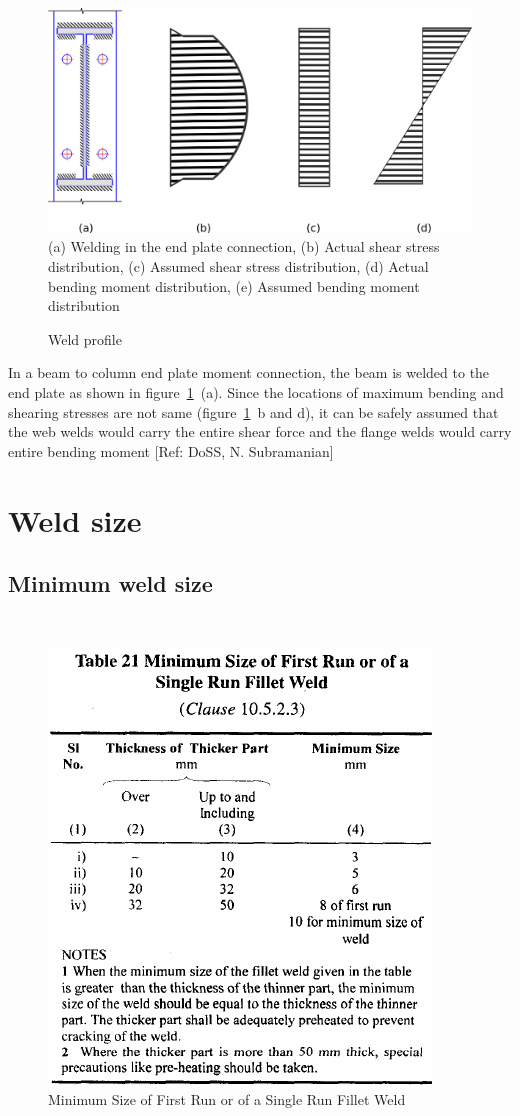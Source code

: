 \documentclass[11.5pt,a4paper,oneside]{report}
\begin{document}
\begin{Form}
\begin{figure}[h]
	\centering
	\includegraphics[width=0.7\linewidth]{weld_stress.png} \\
	{(a) Welding in the end plate connection, (b) Actual shear stress distribution, (c) Assumed shear stress distribution, (d) Actual bending moment distribution, (e) Assumed bending moment distribution}
	\caption[Weld stress]{Weld profile}
	\label{fig:weld_stress}
\end{figure}

In a beam to column end plate moment connection, the beam is welded to the end plate as shown in figure~\ref{fig:weld_stress}~(a). Since the locations of maximum bending and shearing stresses are not same (figure~\ref{fig:weld_stress}~b and d), it can be safely assumed that the web welds would carry the entire shear force and the flange welds would carry entire bending moment [Ref: DoSS, N. Subramanian] 

\section{Weld size}

\subsection{Minimum weld size}
\quad {} \\

\begin{figure}
	\centering
	\includegraphics[width=0.3\linewidth]{min_weld}
	\caption{Minimum Size of First Run or of a Single Run Fillet Weld}
	\label{fig:minweld}
\end{figure}


\end{Form}
\end{document}

